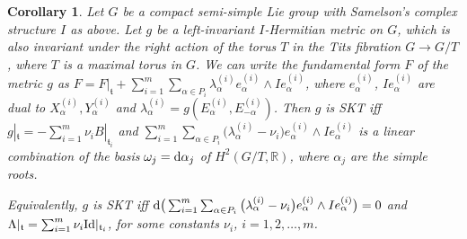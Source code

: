 \documentclass[pdftex]{sigma}
\numberwithin{equation}{section}
\newtheorem{Corollary}[Theorem]{Corollary}
\begin{document}
\begin{Corollary} \label{th4.1bis}
Let $G$ be a compact semi-simple Lie group with Samelson's complex structure $I$ as above. Let $g$ be a left-invariant $I$-Hermitian metric on $G$, which is also invariant under the right action of the torus $T$ in the Tits fibration $G\rightarrow G/T$, where $T$ is a maximal torus in $G$. We can write the fundamental form $F$ of the metric $g$
as $F = F|_{\mathfrak t} + \sum_{i=1}^m \sum_{\alpha \in P_i} \lambda_{\alpha} ^{(i)} e_{\alpha}^{(i)} \wedge I e_{\alpha}^{(i)}$, where $e_{\alpha}^{(i)}$, $Ie_{\alpha}^{(i)}$ are dual to $X_{\alpha}^{(i)}, Y_{\alpha}^{(i)}$ and $\lambda_{\alpha} ^{(i)}= g (E_{\alpha}^{(i)}, E_{-\alpha}^{(i)})$. Then
 $g$ is SKT iff $g |_{\mathfrak t} = - \sum_{i =1}^m \nu_i B|_{\mathfrak t_i}$ and $ \sum_{i =1}^m \sum_{\alpha \in P_i} \big(\lambda_{\alpha}^{(i)} - \nu_i\big) e_{\alpha}^{(i)} \wedge I e_{\alpha}^{(i)}$ is a linear combination of the basis $\omega_j = {\rm d} \alpha_j$ of $H^2(G/T, \mathbb R)$, where $\alpha_j$ are the simple roots.

Equivalently, $g$ is SKT iff ${\rm d}\big( \sum_{i =1}^m \sum_{\alpha \in P_i} \big(\lambda_{\alpha}^{(i)} - \nu_i\big) e_{\alpha}^{(i)}\wedge I e_{\alpha}^{(i)}\big)=0$ and $\Lambda |_{\mathfrak t} = \sum_{i=1}^m \nu_i {\rm Id}|_{\mathfrak t_i}$, for some constants $\nu_i$, $i= 1,2, \dots, m$.
\end{Corollary}
\end{document}
